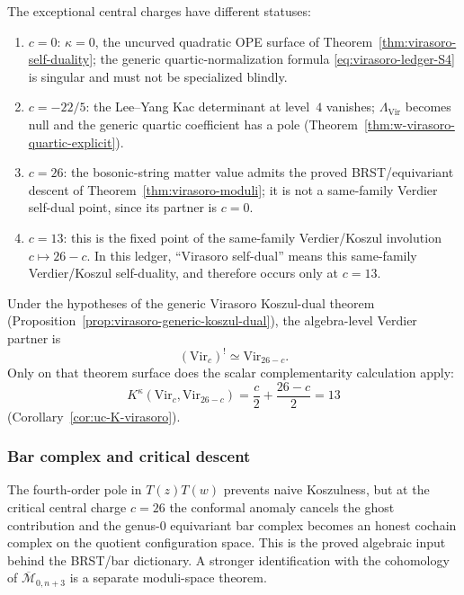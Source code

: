 \begin{proposition}
The exceptional central charges have different statuses:
\begin{enumerate}[label=\textup{(\roman*)}]
\item \(c=0\): \(\kappa=0\), the uncurved quadratic OPE surface of
Theorem~\ref{thm:virasoro-self-duality}; the generic
quartic-normalization formula \eqref{eq:virasoro-ledger-S4} is
singular and must not be specialized blindly.
\item \(c=-22/5\): the Lee--Yang Kac determinant at level~\(4\)
vanishes; \(\Lambda_{\mathrm{Vir}}\) becomes null and the
generic quartic coefficient has a pole
\textup{(}Theorem~\ref{thm:w-virasoro-quartic-explicit}\textup{)}.
\item \(c=26\): the bosonic-string matter value admits the proved
BRST/equivariant descent of
Theorem~\ref{thm:virasoro-moduli}; it is not a same-family
Verdier self-dual point, since its partner is \(c=0\).
\item \(c=13\): this is the fixed point of the same-family
Verdier/Koszul involution \(c\mapsto26-c\).  In this ledger,
``Virasoro self-dual'' means this same-family Verdier/Koszul
self-duality, and therefore occurs only at \(c=13\).
\end{enumerate}

Under the hypotheses of the generic Virasoro Koszul-dual theorem
\textup{(}Proposition~\ref{prop:virasoro-generic-koszul-dual}\textup{)},
the algebra-level Verdier partner is
\[
(\mathrm{Vir}_c)^!\simeq \mathrm{Vir}_{26-c}.
\]
Only on that theorem surface does the scalar complementarity
calculation apply:
\begin{equation}\label{eq:virasoro-ledger-K}
K^\kappa(\mathrm{Vir}_c,\mathrm{Vir}_{26-c})
=\frac c2+\frac{26-c}{2}=13
\end{equation}
\textup{(}Corollary~\ref{cor:uc-K-virasoro}\textup{)}.
\end{proposition}

\subsubsection{Bar complex and critical descent}\label{sec:virasoro-bar-moduli-main}

The fourth-order pole in $T(z)T(w)$ prevents naive Koszulness, but at
the critical central charge $c = 26$ the conformal anomaly cancels the
ghost contribution and the genus-$0$ equivariant bar complex becomes an
honest cochain complex on the quotient configuration space. This is
the proved algebraic input behind the BRST/bar dictionary. A
stronger identification with the cohomology of
$\overline{\mathcal{M}}_{0,n+3}$ is a separate moduli-space theorem.


